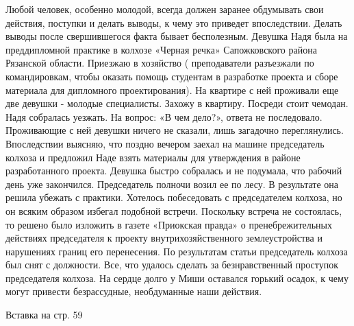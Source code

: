 Любой человек, особенно молодой, всегда должен заранее обдумывать свои действия, поступки и делать выводы, к чему это приведет впоследствии. Делать выводы после свершившегося факта бывает бесполезным. Девушка Надя была на преддипломной практике в колхозе «Черная речка» Сапожковского района Рязанской области. Приезжаю в хозяйство ( преподаватели разъезжали по командировкам, чтобы оказать помощь студентам в разработке проекта и сборе материала для дипломного проектирования). На квартире с ней проживали еще две девушки - молодые специалисты. Захожу в квартиру. Посреди стоит чемодан. Надя собралась уезжать. На вопрос: «В чем дело?», ответа не последовало. Проживающие с ней девушки ничего не сказали, лишь загадочно переглянулись. Впоследствии выясняю, что поздно вечером заехал на машине председатель колхоза и предложил Наде взять материалы для утверждения в районе разработанного проекта. Девушка быстро собралась и не подумала, что рабочий день уже закончился. Председатель полночи возил ее по лесу. В результате она решила убежать с практики. Хотелось побеседовать с председателем колхоза, но он всяким образом избегал подобной встречи. Поскольку встреча не состоялась, то решено было изложить в газете «Приокская правда» о пренебрежительных действиях председателя к проекту внутрихозяйственного землеустройства и нарушениях границ его перенесения. По результатам статьи председатель колхоза был снят с должности. Все, что удалось сделать за безнравственный проступок председателя колхоза. На сердце долго у Миши оставался горький осадок, к чему могут привести безрассудные, необдуманные наши действия.

Вставка на стр. 59

